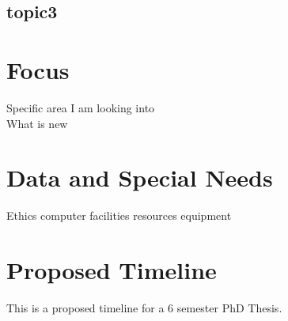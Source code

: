 \documentclass[12pt, twoside]{article}
\begin{document}
\subsection{topic3}
\section{Focus}
Specific area I am looking into\\
What is new\\
\section{Data and Special Needs}
Ethics
computer facilities
resources
equipment

\newpage
\section{Proposed Timeline}

This is a proposed timeline for a 6 semester PhD Thesis.\\

	
\end{document}
